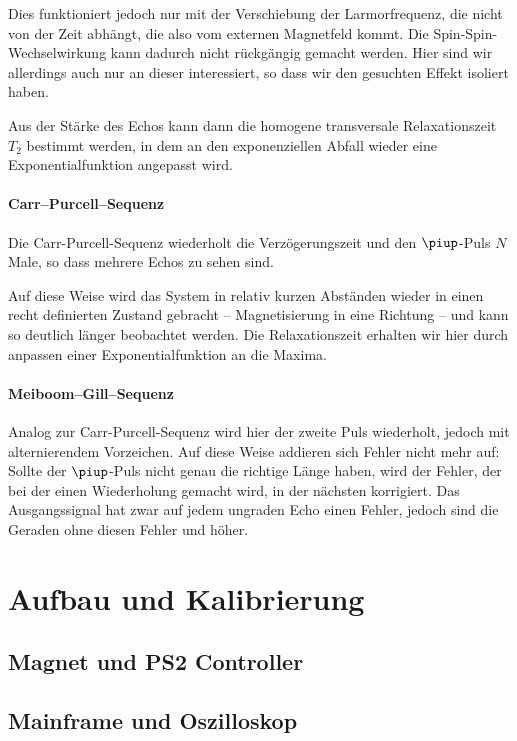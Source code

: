 Dies funktioniert jedoch nur mit der Verschiebung der Larmorfrequenz, die nicht
von der Zeit abhängt, die also vom externen Magnetfeld kommt. Die
Spin-Spin-Wechselwirkung kann dadurch nicht rückgängig gemacht werden. Hier
sind wir allerdings auch nur an dieser interessiert, so dass wir den gesuchten
Effekt isoliert haben.

Aus der Stärke des Echos kann dann die homogene transversale Relaxationszeit
$T_2$ bestimmt werden, in dem an den exponenziellen Abfall wieder eine
Exponentialfunktion angepasst wird.

\subsubsection{Carr–Purcell–Sequenz}

Die Carr-Purcell-Sequenz wiederholt die Verzögerungszeit und den $\piup$-Puls
$N$ Male, so dass mehrere Echos zu sehen sind.

Auf diese Weise wird das System in relativ kurzen Abständen wieder in einen
recht definierten Zustand gebracht – Magnetisierung in eine Richtung – und kann
so deutlich länger beobachtet werden. Die Relaxationszeit erhalten wir hier
durch anpassen einer Exponentialfunktion an die Maxima.

\subsubsection{Meiboom–Gill–Sequenz}

Analog zur Carr-Purcell-Sequenz wird hier der zweite Puls wiederholt, jedoch
mit alternierendem Vorzeichen. Auf diese Weise addieren sich Fehler nicht mehr
auf: Sollte der $\piup$-Puls nicht genau die richtige Länge haben, wird der
Fehler, der bei der einen Wiederholung gemacht wird, in der nächsten
korrigiert. Das Ausgangssignal hat zwar auf jedem ungraden Echo einen Fehler,
jedoch sind die Geraden ohne diesen Fehler und höher.

\chapter{Aufbau und Kalibrierung}
\section{Magnet und PS2 Controller}
\section{Mainframe und Oszilloskop}

